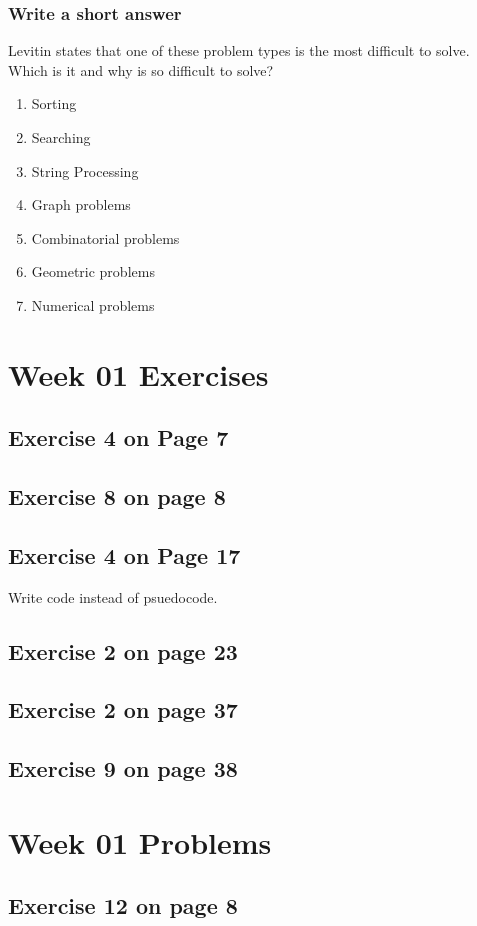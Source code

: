 \documentclass[12pt]{amsart}
\begin{document}
\subsubsection{Write a short answer}

Levitin states that one of these problem types is the most difficult to solve. Which is it and why is so difficult to solve?
\begin{enumerate}
	\item Sorting
	\item Searching
	\item String Processing
	\item Graph problems
	\item Combinatorial problems
	\item Geometric problems
	\item Numerical problems
\end{enumerate}
\section{Week 01 Exercises}
\subsection{Exercise 4 on Page 7}
\subsection{Exercise 8 on page 8}
\subsection{Exercise 4 on Page 17} Write code instead of psuedocode.
\subsection{Exercise 2 on page 23}
\subsection{Exercise 2 on page 37}
\subsection{Exercise 9 on page 38}
 
 
\section{Week 01 Problems}
\subsection{Exercise 12 on page 8} 
\end{document}
